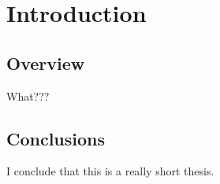 \chapter{Introduction}
\section{\label{section:overview}Overview}
What???
\section{Conclusions}
I conclude that this is a really short thesis.

